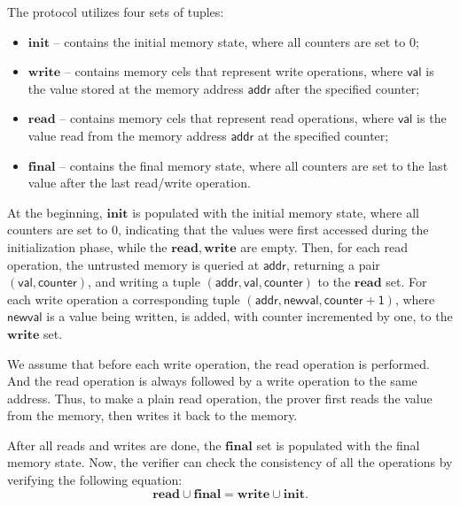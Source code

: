 \documentclass[../../book]{subfiles}
\begin{document}
The protocol utilizes four sets of tuples:
\begin{itemize}
    \item $\mathbf{init}$ -- contains the initial memory state, where all counters are set to $0$;
    \item $\mathbf{write}$ -- contains memory cels that represent write operations, where $\mathsf{val}$
    is the value stored at the memory address $\mathsf{addr}$ after the specified counter;
    \item $\mathbf{read}$ -- contains memory cels that represent read operations, where $\mathsf{val}$
    is the value read from the memory address $\mathsf{addr}$ at the specified counter;
    \item $\mathbf{final}$ -- contains the final memory state, where all counters are set to the last value
    after the last read/write operation.
\end{itemize}

At the beginning, $\mathbf{init}$ is populated with the initial memory state, where all 
counters are set to $0$, indicating that the values were first accessed during the initialization phase, while
the $\mathbf{read}, \mathbf{write}$ are empty. Then, for each read operation, the untrusted memory is queried at 
$\mathsf{addr}$, returning a pair $\mathsf{(val, counter)}$, and writing a tuple $\mathsf{(addr, val, counter)}$ to the 
$\mathbf{read}$ set. For each write operation a corresponding tuple $\mathsf{(addr, newval, counter + 1)}$, where 
$\mathsf{newval}$ is a value being written, is added, with counter incremented by one, to the $\mathbf{write}$ set.

We assume that before each write operation, the read operation is performed. And the read operation is always followed 
by a write operation to the same address. Thus, to make a plain read operation, the prover first reads the value from 
the memory, then writes it back to the memory.

After all reads and writes are done, the $\mathbf{final}$ set is populated with the final memory state. Now, the
verifier can check the consistency of all the operations by verifying the following equation:
\begin{equation*}
    \mathbf{read} \cup \mathbf{final} = \mathbf{write} \cup \mathbf{init}.
\end{equation*}
\end{document}
